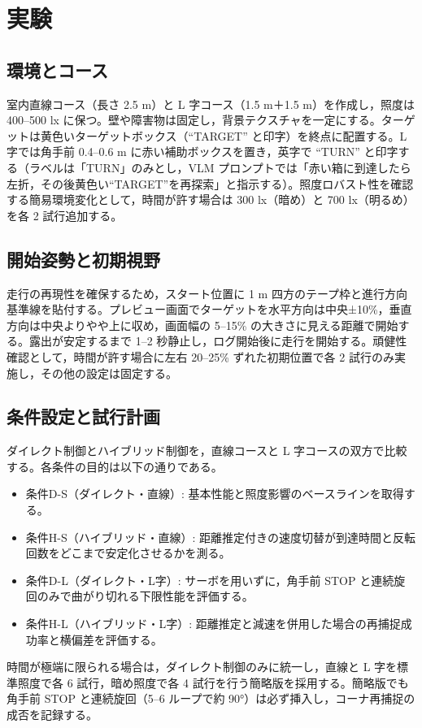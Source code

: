 \documentclass[a4paper,11pt]{ltjsreport}
\begin{document}
\chapter{実験}
\label{chap:experiments}

\section{環境とコース}
室内直線コース（長さ 2.5 m）と L 字コース（1.5 m＋1.5 m）を作成し，照度は 400--500 lx に保つ。壁や障害物は固定し，背景テクスチャを一定にする。ターゲットは黄色いターゲットボックス（“TARGET” と印字）を終点に配置する。L 字では角手前 0.4--0.6 m に赤い補助ボックスを置き，英字で “TURN” と印字する（ラベルは「TURN」のみとし，VLM プロンプトでは「赤い箱に到達したら左折，その後黄色い“TARGET”を再探索」と指示する）。照度ロバスト性を確認する簡易環境変化として，時間が許す場合は 300 lx（暗め）と 700 lx（明るめ）を各 2 試行追加する。

\section{開始姿勢と初期視野}
走行の再現性を確保するため，スタート位置に 1 m 四方のテープ枠と進行方向基準線を貼付する。プレビュー画面でターゲットを水平方向は中央±10\%，垂直方向は中央よりやや上に収め，画面幅の 5--15\% の大きさに見える距離で開始する。露出が安定するまで 1--2 秒静止し，ログ開始後に走行を開始する。頑健性確認として，時間が許す場合に左右 20--25\% ずれた初期位置で各 2 試行のみ実施し，その他の設定は固定する。

\section{条件設定と試行計画}
ダイレクト制御とハイブリッド制御を，直線コースと L 字コースの双方で比較する。各条件の目的は以下の通りである。
\begin{itemize}
  \item 条件D-S（ダイレクト・直線）: 基本性能と照度影響のベースラインを取得する。
  \item 条件H-S（ハイブリッド・直線）: 距離推定付きの速度切替が到達時間と反転回数をどこまで安定化させるかを測る。
  \item 条件D-L（ダイレクト・L字）: サーボを用いずに，角手前 STOP と連続旋回のみで曲がり切れる下限性能を評価する。
  \item 条件H-L（ハイブリッド・L字）: 距離推定と減速を併用した場合の再捕捉成功率と横偏差を評価する。
\end{itemize}
時間が極端に限られる場合は，ダイレクト制御のみに統一し，直線と L 字を標準照度で各 6 試行，暗め照度で各 4 試行を行う簡略版を採用する。簡略版でも角手前 STOP と連続旋回（5--6 ループで約 90°）は必ず挿入し，コーナ再捕捉の成否を記録する。
\end{document}
